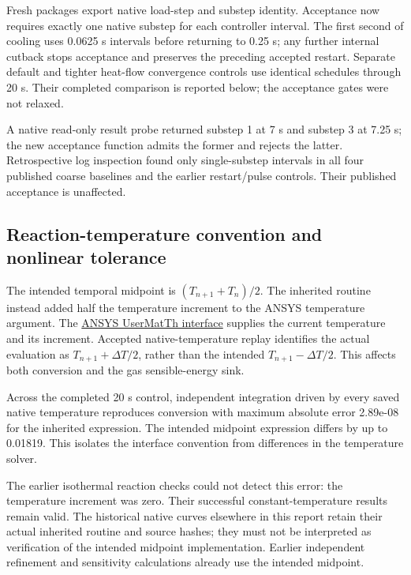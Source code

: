 \documentclass[oneside,openany]{amsdtx}
\begin{document}
Fresh packages export native load-step and substep identity. Acceptance now requires exactly one native substep for each controller interval. The first second of cooling uses 0.0625 s intervals before returning to 0.25 s; any further internal cutback stops acceptance and preserves the preceding accepted restart. Separate default and tighter heat-flow convergence controls use identical schedules through 20 s. Their completed comparison is reported below; the acceptance gates were not relaxed.

A native read-only result probe returned substep 1 at 7 s and substep 3 at 7.25 s; the new acceptance function admits the former and rejects the latter. Retrospective log inspection found only single-substep intervals in all four published coarse baselines and the earlier restart/pulse controls. Their published acceptance is unaffected.

\subsection{Reaction-temperature convention and nonlinear tolerance}

The intended temporal midpoint is $(T_{n+1}+T_n)/2$. The inherited routine instead added half the temperature increment to the ANSYS temperature argument. The \href{https://ansyshelp.ansys.com/public/Views/Secured/corp/v261/en/ans_prog/Z7K4r1e5lcd.html}{ANSYS UserMatTh interface} supplies the current temperature and its increment. Accepted native-temperature replay identifies the actual evaluation as $T_{n+1}+\Delta T/2$, rather than the intended $T_{n+1}-\Delta T/2$. This affects both conversion and the gas sensible-energy sink.

Across the completed 20 s control, independent integration driven by every saved native temperature reproduces conversion with maximum absolute error 2.89e-08 for the inherited expression. The intended midpoint expression differs by up to 0.01819. This isolates the interface convention from differences in the temperature solver.

The earlier isothermal reaction checks could not detect this error: the temperature increment was zero. Their successful constant-temperature results remain valid. The historical native curves elsewhere in this report retain their actual inherited routine and source hashes; they must not be interpreted as verification of the intended midpoint implementation. Earlier independent refinement and sensitivity calculations already use the intended midpoint.
\end{document}
